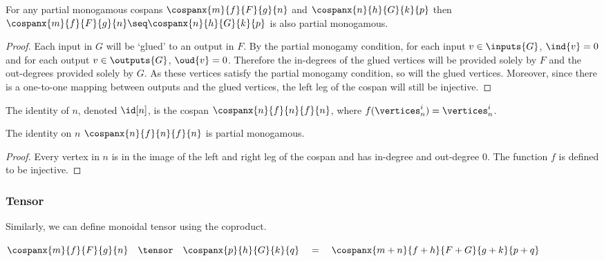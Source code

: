 \documentclass[10pt]{article}
\begin{document}
\begin{proposition}
    For any partial monogamous cospans $\cospanx{m}{f}{F}{g}{n}$ and $\cospanx{n}{h}{G}{k}{p}$ then $\cospanx{m}{f}{F}{g}{n} \seq \cospanx{n}{h}{G}{k}{p}$ is also partial monogamous.
\end{proposition}
\begin{proof}
    Each input in $G$ will be `glued' to an output in $F$.
    By the partial monogamy condition, for each input $v \in \inputs{G}$, $\ind{v} = 0$ and for each output $v \in \outputs{G}$, $\oud{v} = 0$.
    Therefore the in-degrees of the glued vertices will be provided solely by $F$ and the out-degrees provided solely by $G$.
    As these vertices satisfy the partial monogamy condition, so will the glued vertices.
    Moreover, since there is a one-to-one mapping between outputs and the glued vertices, the left leg of the cospan will still be injective.
\end{proof}

\begin{definition}[Identity]
    The identity of $n$, denoted $\id[n]$, is the cospan $\cospanx{n}{f}{n}{f}{n}$, where $f(\vertices^i_n) = \vertices^i_n$.
\end{definition}

\begin{center}
    
\end{center}

\begin{proposition}\label{prop:identity-pm}
    The identity on $n$ $\cospanx{n}{f}{n}{f}{n}$ is partial monogamous.
\end{proposition}
\begin{proof}
    Every vertex in $n$ is in the image of the left and right leg of the cospan and has in-degree and out-degree $0$.
    The function $f$ is defined to be injective.
\end{proof}

\subsubsection{Tensor}

Similarly, we can define monoidal tensor using the coproduct.

\begin{center}
    $\cospanx{m}{f}{F}{g}{n} \quad \tensor \quad \cospanx{p}{h}{G}{k}{q} \quad = \quad \cospanx{m+n}{f+h}{F + G}{g+k}{p+q}$ 

    \vspace{1em}

     \
    \raisebox{1.4em}{$\tensor$} \
     \
    \raisebox{1em}{$=$} \
    \raisebox{-1em}{}
\end{center}
\end{document}
